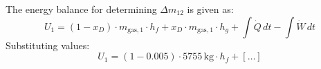 The energy balance for determining \( \Delta m_{12} \) is given as:  
\[
U_1 = (1 - x_D) \cdot m_{\text{gas},1} \cdot h_f + x_D \cdot m_{\text{gas},1} \cdot h_g + \int \dot{Q} \, dt - \int \dot{W} \, dt
\]  
Substituting values:  
\[
U_1 = (1 - 0.005) \cdot 5755 \, \text{kg} \cdot h_f + [\ldots]
\]